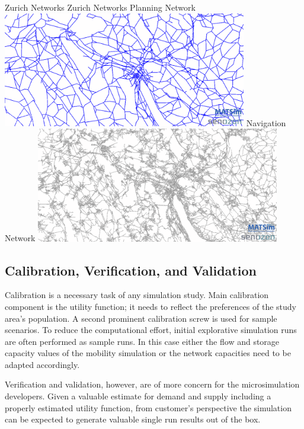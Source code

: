 \createfigure%
{Zurich Networks}%
{Zurich Networks}%
{\label{fig:zhnetwork}}%
{%
  \createsubfigure%
  {Planning Network}%
  {\includegraphics[width=0.8\textwidth,angle=0]{using/figures/planning.png}}%
  {\label{fig:planningnetwork}}%
  {}%
  \createsubfigure%
  {Navigation Network}%
	{\includegraphics[width=0.8\textwidth,angle=0]{using/figures/navigation.png}}%
  {\label{fig:navigationnetwork}}%
  {}%
}%
{}

\subsection{Calibration, Verification, and Validation}
Calibration is a necessary task of any simulation study. Main calibration component is the utility function; it needs to reflect the preferences of the study area's population. A second prominent calibration screw is used for sample scenarios. To reduce the computational effort, initial explorative simulation runs are often performed as sample runs. In this case either the flow and storage capacity values of the mobility simulation or the network capacities need to be adapted accordingly.

Verification and validation, however, are of more concern for the microsimulation developers. Given a valuable estimate for demand and supply including a properly estimated utility function, from customer's perspective the simulation can be expected to generate valuable single run results out of the box.

